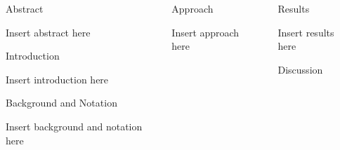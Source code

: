 \documentclass[final]{beamer}
\newlength{\sepwidth}
\newlength{\colwidth}
\newcommand{\separatorcolumn}{\begin{column}{\sepwidth}\end{column}}
\begin{document}
\begin{frame}[t]
\begin{columns}[t]
\separatorcolumn

\begin{column}{\colwidth}

  \begin{block}{Abstract}

    \medskip
    Insert abstract here
    \vspace{400px}

  \end{block}

  \begin{block}{Introduction}

    \medskip
    Insert introduction here
    \vspace{400px}

  \end{block}

  \begin{block}{Background and Notation}

    \medskip
    Insert background and notation here
    \vspace{300px}

  \end{block}

\end{column}

\separatorcolumn

\begin{column}{\colwidth}

  \begin{block}{Approach}

    \medskip
    Insert approach here
    \vspace{1500px}

  \end{block}

\end{column}

\separatorcolumn

\begin{column}{\colwidth}

  \begin{block}{Results}

    \medskip
    Insert results here
    \vspace{400px}

  \end{block}

  \begin{block}{Discussion}


\end{block}
\end{column}
\end{columns}
\end{frame}
\end{document}
